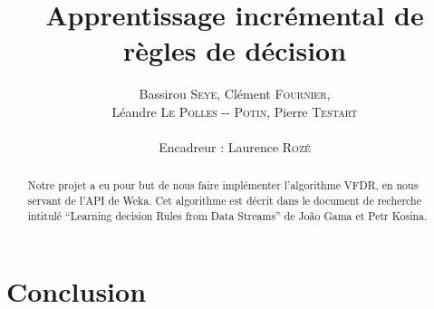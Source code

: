 \documentclass[a4paper,11pt]{article}
\title{ \textbf{Apprentissage incrémental de règles de décision} }
\author{Bassirou \textsc{Seye}, Clément \textsc{Fournier}, \\
        Léandre \textsc{Le Polles -{}- Potin}, Pierre \textsc{Testart} \\
        \\
        Encadreur : Laurence \textsc{Rozé}}
\date{}                    %
\begin{document}
          

    \maketitle                 %
    \thispagestyle{empty}      %

    \begin{abstract}
        Notre projet a eu pour but de nous faire implémenter l’algorithme VFDR, en nous servant de l’API de Weka. Cet algorithme est décrit dans le document de recherche intitulé “Learning decision Rules from Data Streams” de João Gama et Petr Kosina.

    \end{abstract} 

    
    
    
        

    \section{Conclusion} 

    \nocite{*}
    
\end{document}
